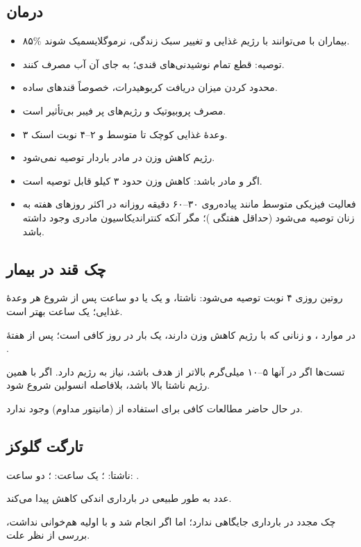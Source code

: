 \documentclass[12pt,a4paper]{article}
\begin{document}
\subsection*{درمان }
\begin{itemize}
\item ۸۵\% بیماران با  می‌توانند با رژیم غذایی و تغییر سبک زندگی، نرموگلایسمیک شوند.
\item توصیه: قطع تمام نوشیدنی‌های قندی؛ به جای آن آب مصرف کنند.
\item محدود کردن میزان دریافت کربوهیدرات، خصوصاً قندهای ساده.
\item مصرف پروبیوتیک و رژیم‌های پر فیبر بی‌تأثیر است.
\item ۳ وعدهٔ غذایی کوچک تا متوسط و ۲--۴ نوبت اسنک.
\item رژیم کاهش وزن در مادر باردار توصیه نمی‌شود.
\item اگر  و مادر  باشد: کاهش وزن حدود ۳ کیلو قابل توصیه است.
\item فعالیت فیزیکی متوسط مانند پیاده‌روی ۳۰--۶۰ دقیقه روزانه در اکثر روزهای هفته به زنان  توصیه می‌شود (حداقل هفتگی )؛ مگر آنکه کنتراندیکاسیون مادری وجود داشته باشد.
\end{itemize}
\subsection*{چک قند در بیمار }
روتین روزی ۴ نوبت توصیه می‌شود: ناشتا، و یک یا دو ساعت پس از شروع هر وعدهٔ غذایی؛ یک ساعت بهتر است.

در موارد ، و زنانی که با رژیم کاهش وزن دارند، یک بار در روز کافی است؛ پس از هفتهٔ .

تست‌ها اگر در آنها ۵--۱۰ میلی‌گرم بالاتر از هدف باشد، نیاز به  رژیم دارد. اگر با همین رژیم ناشتا بالا باشد، بلافاصله انسولین شروع شود.

در حال حاضر مطالعات کافی برای استفاده از  (مانیتور مداوم) وجود ندارد.
\subsection*{تارگت گلوکز}
ناشتا: ؛ یک ساعت: ؛ دو ساعت: .

عدد  به طور طبیعی در بارداری اندکی کاهش پیدا می‌کند.

چک مجدد  در بارداری  جایگاهی ندارد؛ اما اگر انجام شد و با  اولیه هم‌خوانی نداشت، بررسی از نظر علت.
\end{document}
